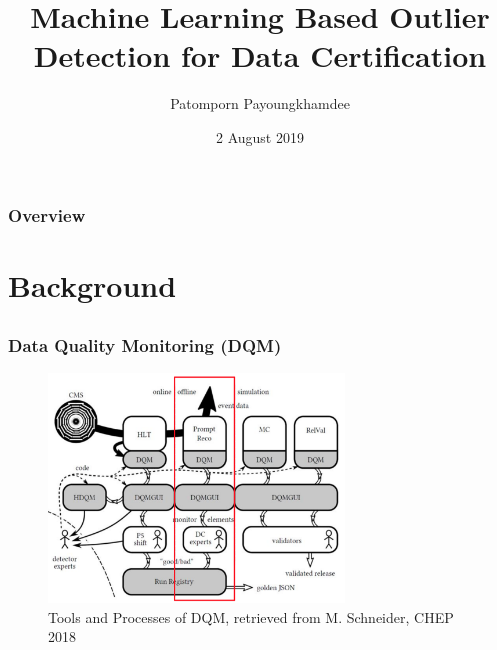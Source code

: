\documentclass{beamer}
\title[ML based Outlier Detection for DC]{Machine Learning Based Outlier Detection for Data Certification} %
\author{Patomporn Payoungkhamdee} %
\institute[MU] %
{
Mahidol University \\ %
\medskip
\textit{patomporn.pay@gmail.com} %
}
\date{2 August 2019} %
\begin{document}
\begin{frame}
\titlepage %
\end{frame}

\begin{frame}
\frametitle{Overview} %
\tableofcontents %
\end{frame}


\section{Background} %

\subsection{} %

\begin{frame}
\frametitle{Data Quality Monitoring (DQM)}

\begin{figure}
\includegraphics[height=0.7\textheight, width=0.7\textwidth]{images/dqm_flow}
\caption{Tools and Processes of DQM, retrieved from M. Schneider, CHEP 2018}
\end{figure}

\end{frame}
\end{document}
